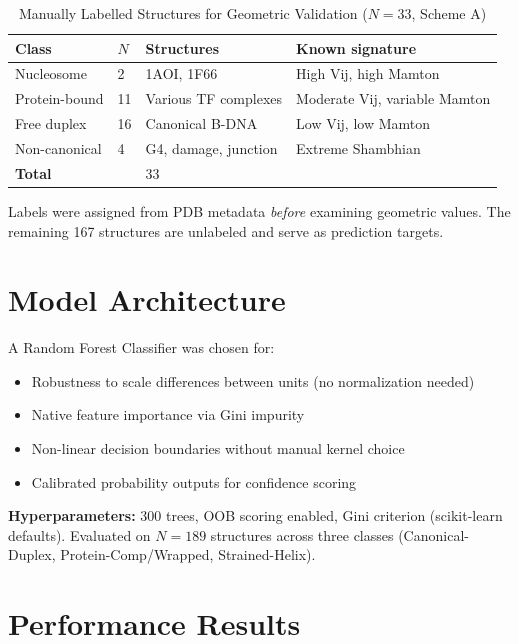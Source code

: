 \begin{table}[h]
    \centering
    \caption{Manually Labelled Structures for Geometric Validation ($N=33$, Scheme A)}
    \begin{tabular}{llll}
        \toprule
        \textbf{Class} & $N$ & \textbf{Structures} & \textbf{Known signature} \\
        \midrule
        Nucleosome      & 2  & 1AOI, 1F66           & High Vij, high Mamton \\
        Protein-bound   & 11 & Various TF complexes  & Moderate Vij, variable Mamton \\
        Free duplex     & 16 & Canonical B-DNA       & Low Vij, low Mamton \\
        Non-canonical   & 4  & G4, damage, junction  & Extreme Shambhian \\
        \bottomrule
        \multicolumn{2}{l}{\textbf{Total}} & 33 & \\
        \bottomrule
    \end{tabular}
\end{table}

Labels were assigned from PDB metadata \textit{before} examining geometric values. The remaining 167 structures are unlabeled and serve as prediction targets.

\section{Model Architecture}

A Random Forest Classifier was chosen for:
\begin{itemize}
    \item Robustness to scale differences between units (no normalization needed)
    \item Native feature importance via Gini impurity
    \item Non-linear decision boundaries without manual kernel choice
    \item Calibrated probability outputs for confidence scoring
\end{itemize}

\textbf{Hyperparameters:} 300 trees, OOB scoring enabled, Gini criterion (scikit-learn defaults). Evaluated on $N = 189$ structures across three classes (Canonical-Duplex, Protein-Comp/Wrapped, Strained-Helix).

\section{Performance Results}

